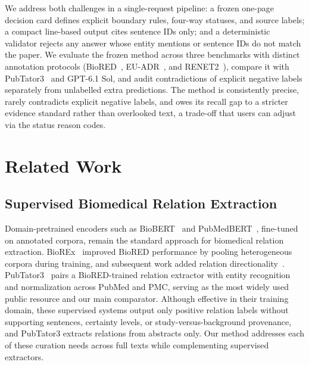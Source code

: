\documentclass[preprint,10pt,letterpaper]{elsarticle}
\begin{document}
We address both challenges in a single-request pipeline: a frozen one-page decision card defines explicit boundary rules, four-way statuses, and source labels; a compact line-based output cites sentence IDs only; and a deterministic validator rejects any answer whose entity mentions or sentence IDs do not match the paper. We evaluate the frozen method across three benchmarks with distinct annotation protocols (BioRED~\cite{luo2022biored}, EU-ADR~\cite{vanmulligen2012euadr}, and RENET2~\cite{su2021renet2}), compare it with PubTator3~\cite{wei2024pubtator3} and GPT-6.1 Sol, and audit contradictions of explicit negative labels separately from unlabelled extra predictions. The method is consistently precise, rarely contradicts explicit negative labels, and owes its recall gap to a stricter evidence standard rather than overlooked text, a trade-off that users can adjust via the status reason codes.

\section{Related Work}

\subsection{Supervised Biomedical Relation Extraction}
Domain-pretrained encoders such as BioBERT~\cite{lee2020biobert} and PubMedBERT~\cite{gu2021pubmedbert}, fine-tuned on annotated corpora, remain the standard approach for biomedical relation extraction. BioREx~\cite{lai2023biorex} improved BioRED performance by pooling heterogeneous corpora during training, and subsequent work added relation directionality~\cite{lai2025directionality}. PubTator3~\cite{wei2024pubtator3} pairs a BioRED-trained relation extractor with entity recognition and normalization across PubMed and PMC, serving as the most widely used public resource and our main comparator. Although effective in their training domain, these supervised systems output only positive relation labels without supporting sentences, certainty levels, or study-versus-background provenance, and PubTator3 extracts relations from abstracts only. Our method addresses each of these curation needs across full texts while complementing supervised extractors.
\end{document}
